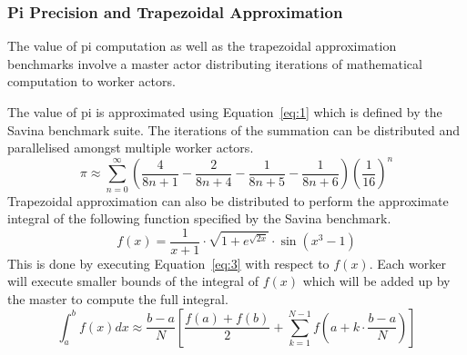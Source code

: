 \documentclass[oneside]{um-fict}
\begin{document}
\subsubsection{Pi Precision and Trapezoidal Approximation}
The value of pi computation as well as the trapezoidal approximation benchmarks involve a master actor distributing iterations of mathematical computation to worker actors.

The value of pi is approximated using Equation~\ref{eq:1} which is defined by the Savina benchmark suite. The iterations of the summation can be distributed and parallelised amongst multiple worker actors.
\begin{equation} \label{eq:1}
\pi\approx\sum_{n=0}^{\infty}\left(\frac{4}{8n+1}-\frac{2}{8n+4}-\frac{1}{8n+5}-\frac{1}{8n+6}\right) \left(\frac{1}{16} \right)^n
\end{equation}
Trapezoidal approximation can also be distributed to perform the approximate integral of the following function specified by the Savina benchmark.
\begin{equation} \label{eq:2}
f(x)=\frac{1}{x+1}\cdot\sqrt{1+e^{\sqrt{2x}}}\cdot \sin\left(x^3-1\right)
\end{equation}
This is done by executing Equation~\ref{eq:3} with respect to $f(x)$. Each worker will execute smaller bounds of the integral of $f(x)$ which will be added up by the master to compute the full integral.
\begin{equation} \label{eq:3}
\int_{a}^{b}f(x)dx\approx\frac{b-a}{N}\left[ \frac{f(a)+f(b)}{2}+\sum_{k=1}^{N-1}f\left( a+k\cdot\frac{b-a}{N} \right) \right]
\end{equation}
\end{document}

